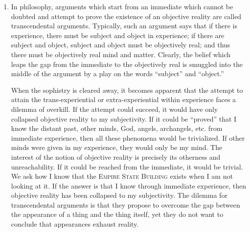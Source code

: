 \begin{enumerate}[label=\textbf{\Alph*.}, wide, nosep, itemsep=1em]
Consider the philosopher's question of how I know whether the \textsc{Empire State Building} continues to exist when I am not looking at it. The Wittgensteinian position on this question would be that it is problematic because it is a misuse of ordinary language; and because there is no behavioral context which constitutes a use for the question. According to this position, we would not encounter such problems if we would use ordinary language properly. But what does this position amount to? The philosopher's question has not been proved improper; it has been defined as improper because it leads to problems. The reason why \enquote{the proper use of ordinary language never leads to paradoxes} is that Wittgenstein has defined proper use as use in which no paradoxes are visible. Wittgenstein has not resolved or eliminated any problems; he has just refused to notice them. Wittgenstein attempts to pass off, as a discovery about philosophy and language, a gratuitous definition to the effect that certain portions of the natural language which embarrass him are inadmissible, a gratuitous ban on certain portions of the natural language which embarrass him. His purpose is to make criticism of his inherited beliefs impossible, to give them a spurious inescapability. Wittgenstein's maneuver is the last word in modish intellectual dishonesty. 

\item In philosophy, arguments which start from an immediate which cannot be doubted and attempt to prove the existence of an objective reality are called transcendental arguments. Typically, such an argument says that if there is experience, there must be subject and object in experience; if there are subject and object, subject and object must be objectively real; and thus there must be objectively real mind and matter. Clearly, the belief which leaps the gap from the immediate to the objectively real is smuggled into the middle of the argument by a play on the words \enquote{subject} and \enquote{object.} 

When the sophistry is cleared away, it becomes apparent that the attempt to attain the trans-experiential or extra-experiential within experience faces a dilemma of overkill. If the attempt could succeed, it would have only collapsed objective reality to my subjectivity. If it could be \enquote{proved} that I know the distant past, other minds, God, angels, archangels, etc. from immediate experience, then all these phenomena would be trivialized. If other minds were given in my experience, they would only be my mind. The interest of the notion of objective reality is precisely its otherness and unreachability. If it could be reached from the immediate, it would be trivial. We ask how I know that the \textsc{Empire State Building} exists when I am not looking at it. If the answer is that I know through immediate experience, then objective reality has been collapsed to my subjectivity. The dilemma for transcendental arguments is that they propose to overcome the gap between the appearance of a thing and the thing itself, yet they do not want to conclude that appearances exhaust reality. 


\end{enumerate}

